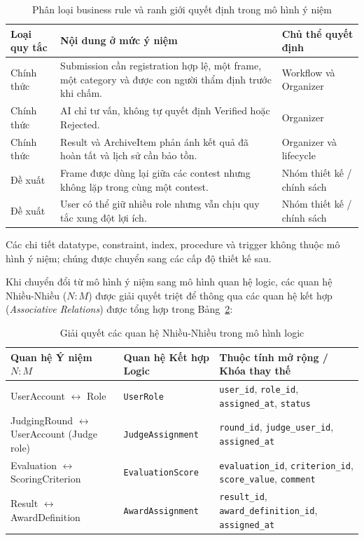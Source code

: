 \begin{table}[!ht]
\centering
\caption{Phân loại business rule và ranh giới quyết định trong mô hình ý niệm}
\label{tab:c4_rule_boundary}
\small
\begin{tabularx}{\textwidth}{p{2.2cm}>{\raggedright\arraybackslash}Xp{3.2cm}}
\toprule
\textbf{Loại quy tắc} & \textbf{Nội dung ở mức ý niệm} & \textbf{Chủ thể quyết định} \\
\midrule
Chính thức & Submission cần registration hợp lệ, một frame, một category và được con người thẩm định trước khi chấm. & Workflow và Organizer \\
Chính thức & AI chỉ tư vấn, không tự quyết định Verified hoặc Rejected. & Organizer \\
Chính thức & Result và ArchiveItem phản ánh kết quả đã hoàn tất và lịch sử cần bảo tồn. & Organizer và lifecycle \\
Đề xuất & Frame được dùng lại giữa các contest nhưng không lặp trong cùng một contest. & Nhóm thiết kế / chính sách \\
Đề xuất & User có thể giữ nhiều role nhưng vẫn chịu quy tắc xung đột lợi ích. & Nhóm thiết kế / chính sách \\
\bottomrule
\end{tabularx}
\end{table}

Các chi tiết datatype, constraint, index, procedure và trigger không thuộc mô hình ý niệm; chúng được chuyển sang các cấp độ thiết kế sau.

Khi chuyển đổi từ mô hình ý niệm sang mô hình quan hệ logic, các quan hệ Nhiều-Nhiều ($N:M$) được giải quyết triệt để thông qua các quan hệ kết hợp (\textit{Associative Relations}) được tổng hợp trong Bảng~\ref{tab:c4_nm_resolution}:

\begin{table}[!ht]
\centering
\caption{Giải quyết các quan hệ Nhiều-Nhiều trong mô hình logic}
\label{tab:c4_nm_resolution}
\scriptsize
\begin{tabularx}{\textwidth}{p{3.8cm}p{3.2cm}>{\raggedright\arraybackslash}X}
\toprule
\textbf{Quan hệ Ý niệm $N:M$} & \textbf{Quan hệ Kết hợp Logic} & \textbf{Thuộc tính mở rộng / Khóa thay thế} \\
\midrule
UserAccount $\leftrightarrow$ Role & \texttt{UserRole} & \texttt{user\_id}, \texttt{role\_id}, \texttt{assigned\_at}, \texttt{status} \\
JudgingRound $\leftrightarrow$ UserAccount (Judge role) & \texttt{JudgeAssignment} & \texttt{round\_id}, \texttt{judge\_user\_id}, \texttt{assigned\_at} \\
Evaluation $\leftrightarrow$ ScoringCriterion & \texttt{EvaluationScore} & \texttt{evaluation\_id}, \texttt{criterion\_id}, \texttt{score\_value}, \texttt{comment} \\
Result $\leftrightarrow$ AwardDefinition & \texttt{AwardAssignment} & \texttt{result\_id}, \texttt{award\_definition\_id}, \texttt{assigned\_at} \\
\bottomrule
\end{tabularx}
\end{table}

